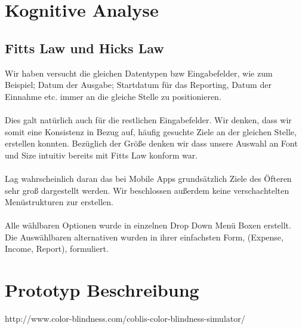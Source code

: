 \documentclass[runningheads,a4paper]{llncs}
\begin{document}
\section{Kognitive Analyse}

\subsection{Fitts Law und Hicks Law}

Wir haben versucht die gleichen Datentypen bzw Eingabefelder, wie zum Beispiel; Datum der Ausgabe; Startdatum für das Reporting, Datum der Einnahme etc. immer an die gleiche Stelle zu positionieren.\\\\  Dies galt natürlich auch für die restlichen Eingabefelder. Wir denken, dass wir somit eine Konsistenz in Bezug auf, häufig gesuchte Ziele an der gleichen Stelle, erstellen konnten. Bezüglich der Größe denken wir dass unsere Auswahl an Font und Size intuitiv bereits mit Fitts Law konform war.\\\\   Lag wahrscheinlich daran das bei Mobile Apps grundsätzlich Ziele des Öfteren sehr groß dargestellt werden. Wir beschlossen außerdem keine verschachtelten Menüstrukturen zur erstellen. \\\\ Alle wählbaren Optionen wurde in einzelnen Drop Down Menü Boxen erstellt.  Die Auswählbaren alternativen wurden in ihrer einfachsten Form, (Expense, Income, Report), formuliert. 


\begin{figure}
\centering
{}
\hfill
{}
\hfill
{}
\end{figure}


\section{Prototyp Beschreibung}

\clearpage

\begin{thebibliography}{1}
 http://www.color-blindness.com/coblis-color-blindness-simulator/
\end{thebibliography}
\end{document}
